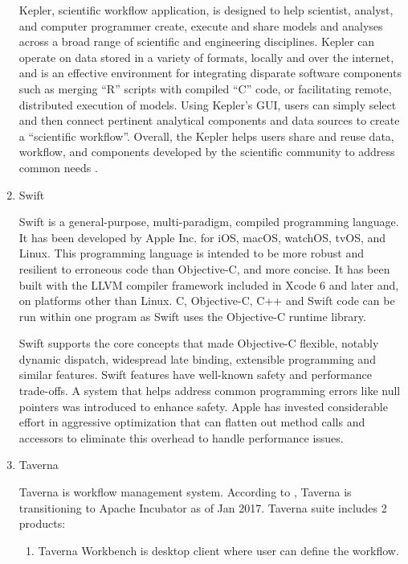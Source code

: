\begin{enumerate}
Kepler, scientific workflow application, is designed to help
scientist, analyst, and computer programmer create, execute and
share models and analyses across a broad range of scientific and
engineering disciplines.  Kepler can operate on data stored in a
variety of formats, locally and over the internet, and is an
effective environment for integrating disparate software components
such as merging ``R'' scripts with compiled ``C'' code, or facilitating
remote, distributed execution of models. Using Kepler's GUI, users
can simply select and then connect pertinent analytical components
and data sources to create a ``scientific workflow''. Overall, the
Kepler helps users share and reuse data, workflow, and components
developed by the scientific community to address common needs
\label{\detokenize{i524/technologies:id10}}{\hyperref[\detokenize{i524/technologies:www-kepler}]{\sphinxcrossref{{[}10{]}}}}.

\item {} 
Swift

Swift is a general-purpose, multi-paradigm, compiled programming
language. It has been developed by Apple Inc. for iOS, macOS,
watchOS, tvOS, and Linux. This programming language is intended to
be more robust and resilient to erroneous code than Objective-C,
and more concise. It has been built with the LLVM compiler
framework included in Xcode 6 and later and, on platforms other
than Linux. C, Objective-C, C++ and Swift code can be run within
one program as Swift uses the Objective-C runtime
library. \label{\detokenize{i524/technologies:id11}}{\hyperref[\detokenize{i524/technologies:www-swift-wikipedia}]{\sphinxcrossref{{[}11{]}}}}

Swift supports the core concepts that made Objective-C flexible,
notably dynamic dispatch, widespread late binding, extensible
programming and similar features. Swift features have well-known
safety and performance trade-offs. A system that helps address
common programming errors like null pointers was introduced to
enhance safety. Apple has invested considerable effort in
aggressive optimization that can flatten out method calls and
accessors to eliminate this overhead to handle performance issues.

\item {} 
Taverna

Taverna is workflow management system. According to
\label{\detokenize{i524/technologies:id12}}{\hyperref[\detokenize{i524/technologies:www-taverna}]{\sphinxcrossref{{[}12{]}}}}, Taverna is transitioning to Apache Incubator
as of Jan 2017.  Taverna suite includes 2 products:
\begin{enumerate}
\item {} 
Taverna Workbench is desktop client where user can define the
workflow.


\end{enumerate}
\end{enumerate}
